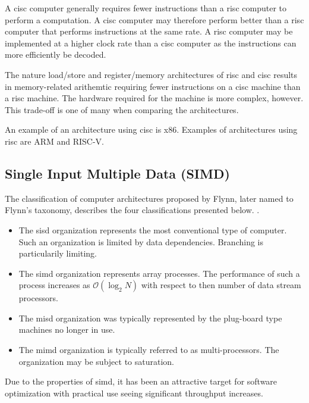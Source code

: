 A \gls{cisc} computer generally requires fewer instructions than a \gls{risc} computer to perform a computation. A \gls{cisc} computer may therefore perform better than a \gls{risc} computer that performs instructions at the same rate. A \gls{risc} computer may be implemented at a higher clock rate than a \gls{cisc} computer as the instructions can more efficiently be decoded\cite{carter2002}.

The nature load/store and register/memory architectures of \gls{risc} and \gls{cisc} results in memory-related arithemtic requiring fewer instructions on a \gls{cisc} machine than a \gls{risc} machine. The hardware required for the machine is more complex, however. This trade-off is one of many when comparing the architectures\cite{carter2002}.

An example of an architecture using \gls{cisc} is \gls{x86}. Examples of architectures using \gls{risc} are ARM and RISC-V.

\subsection{Single Input Multiple Data (SIMD)}

The classification of computer architectures proposed by Flynn, later named to Flynn's taxonomy, describes the four classifications presented below. \cite{flynn1972}.

\begin{itemize}
    \item The \gls{sisd} organization represents the most conventional type of computer. Such an organization is limited by data dependencies. Branching is particularily limiting.
    \item The \gls{simd} organization represents array processes. The performance of such a process increases as $\mathcal{O}(\log_2 N)$ with respect to then number of data stream processors. 
    \item The \gls{misd} organization was typically represented by the plug-board type machines no longer in use.
    \item The \gls{mimd} organization is typically referred to as multi-processors. The organization may be subject to saturation.
\end{itemize}

Due to the properties of \gls{simd}, it has been an attractive target for software optimization with practical use seeing significant throughput increases\cite{dickson2011}.

